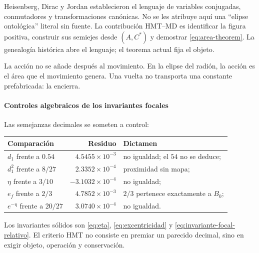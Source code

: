 Heisenberg, Dirac y Jordan establecieron el lenguaje de variables conjugadas,
conmutadores y transformaciones canónicas. No se les atribuye aquí una
\enquote{elipse ontológica} literal sin fuente. La contribución HMT--MD es
identificar la figura positiva, construir sus semiejes desde \((A,C^*)\) y
demostrar \eqref{eq:area-theorem}. La genealogía histórica abre el lenguaje;
el teorema actual fija el objeto.

\begin{narrativebox}
La acción no se añade después al movimiento. En la elipse del radión, la
acción es el área que el movimiento genera. Una vuelta no transporta una
constante prefabricada: la encierra.
\end{narrativebox}

\paragraph{Controles algebraicos de los invariantes focales}

Las semejanzas decimales se someten a control:
\begin{center}
\begin{tabularx}{.96\textwidth}{l r X}
\toprule
Comparación & Residuo & Dictamen\\
\midrule
\(d_1\) frente a \(0.54\) & \(4.5455\times10^{-3}\) & no igualdad; el \(54\) no se deduce;\\
\(d_1^2\) frente a \(8/27\) & \(2.3352\times10^{-4}\) & proximidad sin mapa;\\
\(\eta\) frente a \(3/10\) & \(-3.1032\times10^{-4}\) & no igualdad;\\
\(e_f\) frente a \(2/3\) & \(4.7852\times10^{-3}\) & \(2/3\) pertenece exactamente a \(B_0\);\\
\(e^{-\eta}\) frente a \(20/27\) & \(3.0740\times10^{-4}\) & no igualdad.\\
\bottomrule
\end{tabularx}
\end{center}
Los invariantes sólidos son \eqref{eq:eta}, \eqref{eq:excentricidad} y
\eqref{eq:invariante-focal-relativo}. El criterio HMT no consiste en premiar
un parecido decimal, sino en exigir objeto, operación y conservación.
